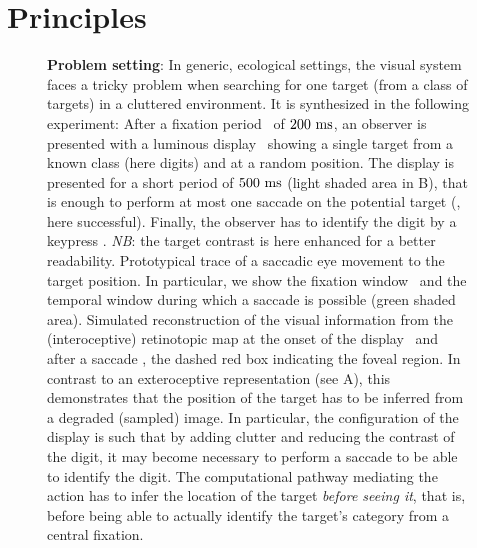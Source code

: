 \section*{Principles}
\label{sec:principles}

\begin{figure}[t!]%
	\caption{%
		{\bf Problem setting}: In generic, ecological settings, the visual system faces a tricky problem when searching for one target (from a class of targets) in a cluttered environment. It is synthesized in the following experiment: %
		\A After a fixation period \FIX\ of $200~\si{\milli\second}$, an observer is presented with a luminous display \DIS\ showing a single target from a known class (here digits) and at a random position. The display is presented for a short period of $500~\si{\milli\second}$ (light shaded area in B), that is enough to perform at most one saccade on the potential target (\SAC , here successful). Finally, the observer has to identify the digit by a keypress \ANS. \emph{NB}: the target contrast is here enhanced for a better readability. %
		\B Prototypical trace of a saccadic eye movement to the target position. In particular, we show the fixation window \FIX\ and the temporal window during which a saccade is possible (green shaded area). %
		\C Simulated reconstruction of the visual information from the (interoceptive) retinotopic map at the onset of the display \DIS\ and after a saccade \SAC , the dashed red box indicating the foveal region. In contrast to an exteroceptive representation (see A), this demonstrates that the position of the target has to be inferred from a degraded (sampled) image. In particular, the configuration of the display is such that by adding clutter and reducing the contrast of the digit, it may become necessary to perform a saccade to be able to identify the digit. The computational pathway mediating the action has to infer the location of the target \emph{before seeing it}, that is, before being able to actually identify the target's category from a central fixation. }%
		\label{fig:intro} %
\end{figure}%

